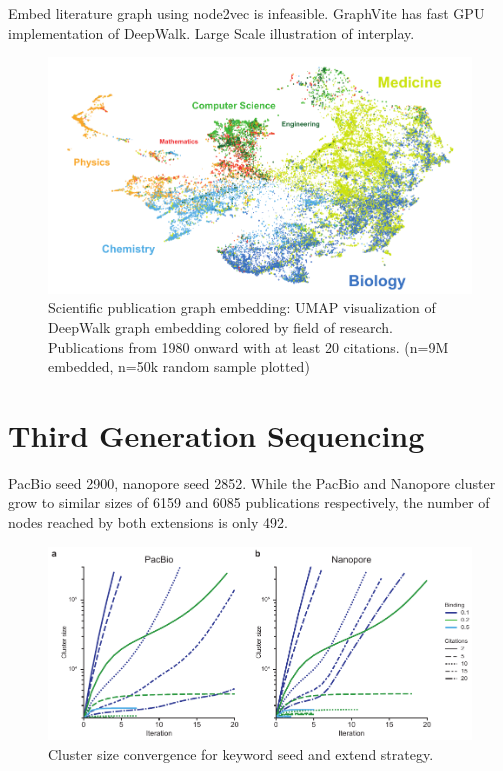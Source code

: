 Embed literature graph using node2vec is infeasible. GraphVite has fast GPU implementation of DeepWalk.
Large Scale illustration of interplay.

\begin{figure}[h]
	\centering
	\includegraphics[width=1.0\textwidth]{figures/state_of_art/umap_global.pdf}
	\captionsetup{format=plain}
	\caption[Scientific literature graph]{Scientific publication graph embedding: UMAP visualization of DeepWalk graph embedding colored by field of research. Publications from 1980 onward with at least 20 citations. (n=9M embedded, n=50k random sample plotted)}
	\label{fig:state_of_art:umap_global}
\end{figure}




\section{Third Generation Sequencing}
\label{sec:state_of_art:third_generation}

PacBio seed 2900, nanopore seed 2852.
While the PacBio and Nanopore cluster grow to similar sizes of 6159 and 6085 publications respectively, the number of nodes reached by both extensions is only 492.


\begin{figure}[h]
	\centering
	\includegraphics[width=1.0\textwidth]{figures/state_of_art/cluster_convergence.pdf}
	\captionsetup{format=plain}
	\caption[Keyword Seed and Extend Convergence]{Cluster size convergence for keyword seed and extend strategy.}
	\label{fig:state_of_art:cluster_convergence}
\end{figure}

